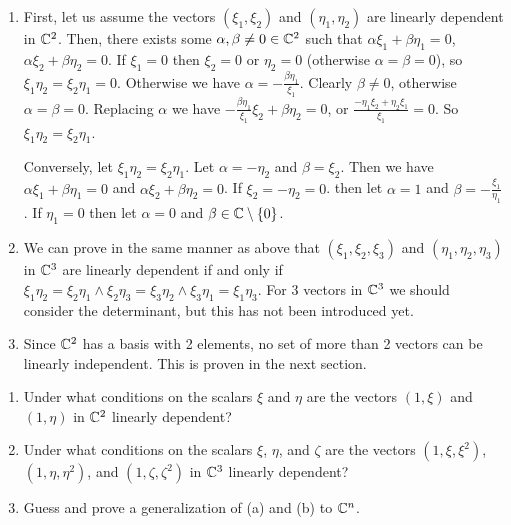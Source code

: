 \begin{solution}
  \begin{enumerate}[label=(\alph*)]
    \item First, let us assume the vectors $(\xi_1, \xi_2)$ and $(\eta_1, \eta_2)$ are linearly dependent in $\mathbb{C}^2$.
      Then, there exists some $\alpha, \beta \neq 0 \in \mathbb{C}^2$ such that $\alpha\xi_1 + \beta\eta_1 = 0$, $\alpha\xi_2 + \beta\eta_2 = 0$.
      If $\xi_1 = 0$ then $\xi_2 = 0$ or $\eta_2 = 0$ (otherwise $\alpha = \beta = 0$), so $\xi_1\eta_2 = \xi_2\eta_1 = 0$.
      Otherwise we have $\alpha = -\frac{\beta\eta_1}{\xi_1}$.
      Clearly $\beta \neq 0$, otherwise $\alpha = \beta = 0$.
      Replacing $\alpha$ we have $-\frac{\beta\eta_1}{\xi_1}\xi_2 + \beta\eta_2 = 0$, or $\frac{-\eta_1\xi_2 + \eta_2\xi_1}{\xi_1} = 0$.
      So $\xi_1\eta_2 = \xi_2\eta_1$.

      Conversely, let $\xi_1\eta_2 = \xi_2\eta_1$.
      Let $\alpha = -\eta_2$ and $\beta = \xi_2$.
      Then we have $\alpha\xi_1 + \beta\eta_1 = 0$ and $\alpha\xi_2 + \beta\eta_2 = 0$.
      If $\xi_2 = -\eta_2 = 0$. then let $\alpha = 1$ and $\beta = -\frac{\xi_1}{\eta_1}$.
      If $\eta_1 = 0$ then let $\alpha = 0$ and $\beta \in \mathbb{C}\setminus\{0\}$.
    \item We can prove in the same manner as above that $(\xi_1, \xi_2, \xi_3)$ and $(\eta_1, \eta_2, \eta_3)$ in $\mathbb{C}^3$ are linearly dependent if and only if $\xi_1\eta_2 = \xi_2\eta_1 \wedge \xi_2\eta_3 = \xi_3\eta_2 \wedge \xi_3\eta_1 = \xi_1\eta_3$.
      For 3 vectors in $\mathbb{C}^3$ we should consider the determinant, but this has not been introduced yet.
    \item Since $\mathbb{C}^2$ has a basis with 2 elements, no set of more than 2 vectors can be linearly independent.
      This is proven in the next section.
  \end{enumerate}
\end{solution}

\begin{problem}
  \begin{enumerate}[label=(\alph*)]
    \item Under what conditions on the scalars $\xi$ and $\eta$ are the vectors $(1, \xi)$ and $(1, \eta)$ in $\mathbb{C}^2$ linearly dependent?
    \item Under what conditions on the scalars $\xi$, $\eta$, and $\zeta$ are the vectors $(1, \xi, \xi^2)$, $(1, \eta, \eta^2)$, and $(1, \zeta, \zeta^2)$ in $\mathbb{C}^3$ linearly dependent?
    \item Guess and prove a generalization of (a) and (b) to $\mathbb{C}^n$.
  \end{enumerate}
\end{problem}

